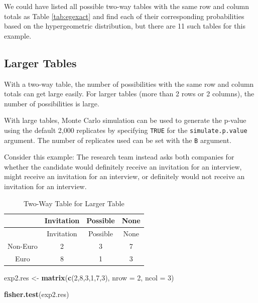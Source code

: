 \documentclass[
]{book}
\newenvironment{Shaded}{\begin{snugshade}}{\end{snugshade}}
\newcommand{\AttributeTok}[1]{\textcolor[rgb]{0.13,0.29,0.53}{#1}}
\newcommand{\DecValTok}[1]{\textcolor[rgb]{0.00,0.00,0.81}{#1}}
\newcommand{\FunctionTok}[1]{\textcolor[rgb]{0.13,0.29,0.53}{\textbf{#1}}}
\newcommand{\NormalTok}[1]{#1}
\newcommand{\OtherTok}[1]{\textcolor[rgb]{0.56,0.35,0.01}{#1}}
\theoremstyle{definition}
\theoremstyle{definition}
\theoremstyle{definition}
\theoremstyle{definition}
\theoremstyle{remark}
\begin{document}
We could have listed all possible two-way tables with the same row and column totals as Table \ref{tab:egexact} and find each of their corresponding probabilities based on the hypergeometric distribution, but there are 11 such tables for this example.

\hypertarget{larger-tables}{%
\subsection{Larger Tables}\label{larger-tables}}

With a two-way table, the number of possibilities with the same row and column totals can get large easily. For larger tables (more than 2 rows or 2 columns), the number of possibilities is large.

With large tables, Monte Carlo simulation can be used to generate the p-value using the default 2,000 replicates by specifying \texttt{TRUE} for the \texttt{simulate.p.value} argument. The number of replicates used can be set with the \texttt{B} argument.

Consider this example: The research team instead asks both companies for whether the candidate would definitely receive an invitation for an interview, might receive an invitation for an interview, or definitely would not receive an invitation for an interview.

\begin{longtable}[]{@{}cccc@{}}
\caption{\label{tab:eglarge} Two-Way Table for Larger Table}\tabularnewline
\toprule\noalign{}
& Invitation & Possible & None \\
\midrule\noalign{}
\endfirsthead
\toprule\noalign{}
& Invitation & Possible & None \\
\midrule\noalign{}
\endhead
\bottomrule\noalign{}
\endlastfoot
Non-Euro & 2 & 3 & 7 \\
Euro & 8 & 1 & 3 \\
\end{longtable}

\begin{Shaded}
\begin{Highlighting}[]
\NormalTok{exp2.res }\OtherTok{\textless{}{-}} \FunctionTok{matrix}\NormalTok{(}\FunctionTok{c}\NormalTok{(}\DecValTok{2}\NormalTok{,}\DecValTok{8}\NormalTok{,}\DecValTok{3}\NormalTok{,}\DecValTok{1}\NormalTok{,}\DecValTok{7}\NormalTok{,}\DecValTok{3}\NormalTok{), }\AttributeTok{nrow =} \DecValTok{2}\NormalTok{, }\AttributeTok{ncol =} \DecValTok{3}\NormalTok{)}

\FunctionTok{fisher.test}\NormalTok{(exp2.res)}
\end{Highlighting}
\end{Shaded}
\end{document}
